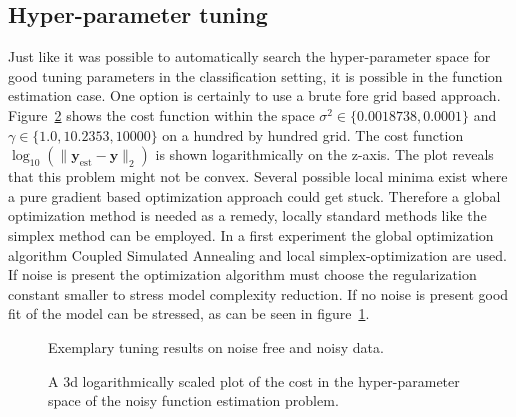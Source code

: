 \subsection{Hyper-parameter tuning}
Just like it was possible to automatically search the hyper-parameter space for good tuning parameters in the classification setting, it is possible in the function estimation case. One option is certainly to use a brute fore grid based approach. Figure~\ref{fig:logGridCost} shows the cost function within the space $\sigma^2 \in \{0.0018738, 0.0001\}$ and $\gamma \in \{1.0, 10.2353 ,10000 \}$ on a hundred by hundred grid. The cost function $\log_{10}(\| \mathbf{y}_{\text{est}} - \mathbf{y}\|_2)$ is shown logarithmically on the z-axis. The plot reveals that this problem might not be convex. Several possible local minima exist where a pure gradient based optimization approach could get stuck. Therefore a global optimization method is needed as a remedy, locally standard methods like the simplex method can be employed.  In a first experiment the global optimization algorithm Coupled Simulated Annealing and local simplex-optimization are used. If noise is present the optimization algorithm must choose the regularization constant smaller to stress model complexity reduction. If no noise is present good fit of the model can be stressed, as can be seen in figure~\ref{fig:autoTune}. 
\begin{figure}
\centering


\caption{Exemplary tuning results on noise free and noisy data.}
\label{fig:autoTune}
\end{figure}
\begin{figure}
\centering

\caption{A 3d logarithmically scaled plot of the cost in the hyper-parameter space of the noisy function estimation problem.}
\label{fig:logGridCost}
\end{figure}

